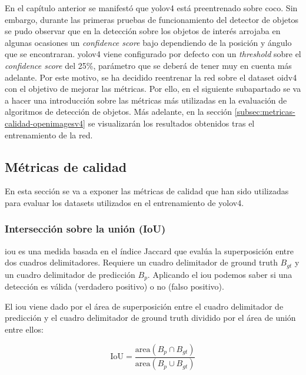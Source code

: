 En el capítulo anterior se manifestó que \gls{yolov4} está preentrenado sobre \gls{coco}. Sin embargo, durante las primeras pruebas de funcionamiento del detector de objetos se pudo observar que en la detección sobre los objetos de interés arrojaba en algunas ocasiones un \textit{confidence score} bajo dependiendo de la posición y ángulo que se encontraran. \gls{yolov4} viene configurado por defecto con un \textit{threshold} sobre el \textit{confidence score} del 25\%, parámetro que se deberá de tener muy en cuenta más adelante. Por este motivo, se ha decidido reentrenar la red sobre el dataset \gls{oidv4} con el objetivo de mejorar las métricas. Por ello, en el siguiente subapartado se va a hacer una introducción sobre las métricas más utilizadas en la evaluación de algoritmos de detección de objetos. Más adelante, en la sección \ref{subsec:metricas-calidad-openimagesv4} se visualizarán los resultados obtenidos tras el entrenamiento de la red.

\subsection{Métricas de calidad}
\label{subsec:metricas-calidad}

En esta sección se va a exponer las métricas de calidad \cite{padillaCITE2020} que han sido utilizadas para evaluar los datasets utilizados en el entrenamiento de \gls{yolov4}.

\subsubsection{Intersección sobre la unión (IoU)}
\label{subsubsec:iou}

\gls{iou} es una medida basada en el índice Jaccard que evalúa la superposición entre dos cuadros delimitadores. Requiere un cuadro delimitador de ground truth $B_{gt}$ y un cuadro delimitador de predicción $B_{p}$. Aplicando el \gls{iou} podemos saber si una detección es válida (verdadero positivo) o no (falso positivo).

El \gls{iou} viene dado por el área de superposición entre el cuadro delimitador de predicción y el cuadro delimitador de ground truth dividido por el área de unión entre ellos:

\begin{equation}
\label{eq:iou}
\text{IoU}=\frac{\text{area}\left(B_{p} \cap B_{gt} \right)}{\text{area}\left(B_{p} \cup B_{gt} \right)}    
\end{equation}

